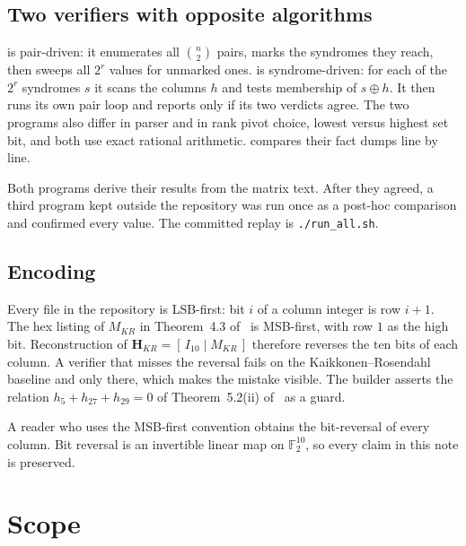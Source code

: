 \documentclass[11pt,a4paper]{article}
\newcommand{\FF}{\mathbb{F}}
\newcommand{\HH}{\boldsymbol{H}}
\begin{document}
\subsection{Two verifiers with opposite algorithms}

 is pair-driven: it enumerates all
$\binom{n}{2}$ pairs, marks the syndromes they reach, then sweeps all
$2^r$ values for unmarked ones.  is
syndrome-driven: for each of the $2^r$ syndromes $s$ it scans the
columns $h$ and tests membership of $s\oplus h$. It then runs its own
pair loop and reports only if its two verdicts agree. The two programs
also differ in parser and in rank pivot choice, lowest versus highest
set bit, and both use exact rational arithmetic. 
compares their fact dumps line by line.

Both programs derive their results from the matrix text. After they
agreed, a third program kept outside the repository was run once as a
post-hoc comparison and confirmed every value. The committed replay
is \texttt{./run\_all.sh}.

\subsection{Encoding}
\label{sec:encoding}

Every file in the repository is LSB-first: bit $i$ of a column integer
is row $i+1$. The hex listing of $M_{KR}$ in Theorem~4.3
of~\cite{DMP2025} is MSB-first, with row $1$ as the high bit.
Reconstruction of $\HH_{KR}=[\,I_{10}\mid M_{KR}\,]$ therefore reverses
the ten bits of each column. A verifier that misses the reversal fails
on the Kaikkonen--Rosendahl baseline and only there, which makes the
mistake visible. The builder asserts the relation
$h_5+h_{27}+h_{29}=0$ of Theorem~5.2(ii) of~\cite{DMP2025} as a guard.

A reader who uses the MSB-first convention obtains the bit-reversal of
every column. Bit reversal is an invertible linear map on $\FF_2^{10}$,
so every claim in this note is preserved.

\section{Scope}
\label{sec:notclaimed}
\end{document}
